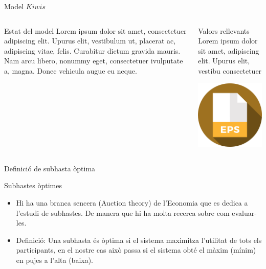 \documentclass[twocolumn]{beamer}
\begin{document}
\begin{frame}{Model $Kiwis$}
\begin{columns}[t]
	\begin{column}{.5\textwidth}
		\begin{block}{Estat del model}
			Lorem ipsum dolor sit amet,
			consectetuer adipiscing elit. Upurus elit, vestibulum ut,
			placerat ac, adipiscing vitae,
			felis. Curabitur dictum gravida
			mauris. Nam arcu libero,
			nonummy eget, consectetuer ivulputate a, magna. Donec
			vehicula augue eu neque.
		\end{block}
	\end{column}
	\begin{column}{.5\textwidth}
		\begin{block}{Valors rellevants}
			Lorem ipsum dolor sit amet,
			adipiscing elit. Upurus elit, vestibu
			consectetuer 
		\end{block}
		\includegraphics[width=3.5cm]{eps}
	\end{column}
\end{columns}
\end{frame}

\begin{frame}{Definició de subhasta òptima}

\begin{block}{Subhastes òptimes}
	\begin{itemize}
		\item Hi ha una branca sencera (Auction theory) de l'Economia que es dedica a l'estudi de subhastes. De manera que hi ha molta recerca sobre com evaluar-les.
		\item Definició: Una subhasta és òptima si el sistema maximitza l'utilitat de tots els participants, en el nostre cas això passa si el sistema obté el màxim (mínim) en pujes a l'alta (baixa).
	\end{itemize}
\end{block}
\end{frame}
\end{document}

